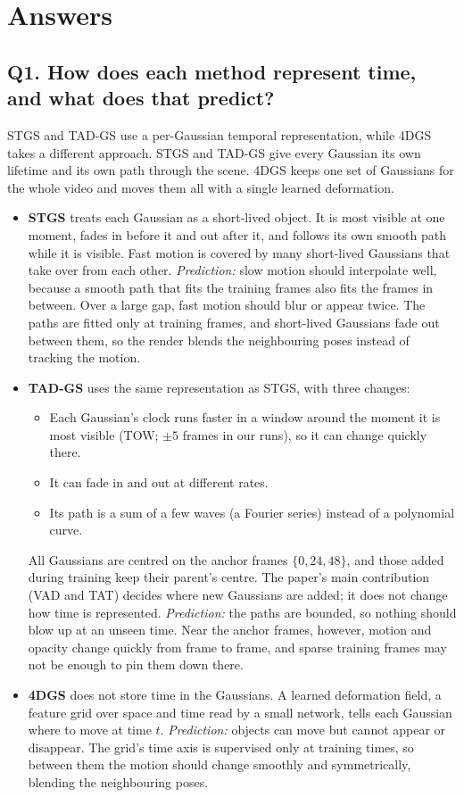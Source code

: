 \documentclass[10pt,a4paper]{article}
\begin{document}
\section{Answers}
\subsection*{Q1. How does each method represent time, and what does that predict?}
STGS and TAD-GS use a per-Gaussian temporal representation, while 4DGS takes a different approach. STGS and TAD-GS give every Gaussian its own lifetime and its own path through the scene. 4DGS keeps one set of Gaussians for the whole video and moves them all with a single learned deformation.
\begin{itemize}
\item \textbf{STGS} treats each Gaussian as a short-lived object. It is most visible at one moment, fades in before it and out after it, and follows its own smooth path while it is visible. Fast motion is covered by many short-lived Gaussians that take over from each other.
\emph{Prediction:} slow motion should interpolate well, because a smooth path that fits the training frames also fits the frames in between. Over a large gap, fast motion should blur or appear twice. The paths are fitted only at training frames, and short-lived Gaussians fade out between them, so the render blends the neighbouring poses instead of tracking the motion.
\item \textbf{TAD-GS} uses the same representation as STGS, with three changes:
\begin{itemize}
\item Each Gaussian's clock runs faster in a window around the moment it is most visible (TOW; $\pm5$ frames in our runs), so it can change quickly there.
\item It can fade in and out at different rates.
\item Its path is a sum of a few waves (a Fourier series) instead of a polynomial curve.
\end{itemize}
All Gaussians are centred on the anchor frames $\{0,24,48\}$, and those added during training keep their parent's centre. The paper's main contribution (VAD and TAT) decides where new Gaussians are added; it does not change how time is represented.
\emph{Prediction:} the paths are bounded, so nothing should blow up at an unseen time. Near the anchor frames, however, motion and opacity change quickly from frame to frame, and sparse training frames may not be enough to pin them down there.
\item \textbf{4DGS} does not store time in the Gaussians. A learned deformation field, a feature grid over space and time read by a small network, tells each Gaussian where to move at time $t$.
\emph{Prediction:} objects can move but cannot appear or disappear. The grid's time axis is supervised only at training times, so between them the motion should change smoothly and symmetrically, blending the neighbouring poses.
\end{itemize}
\end{document}
